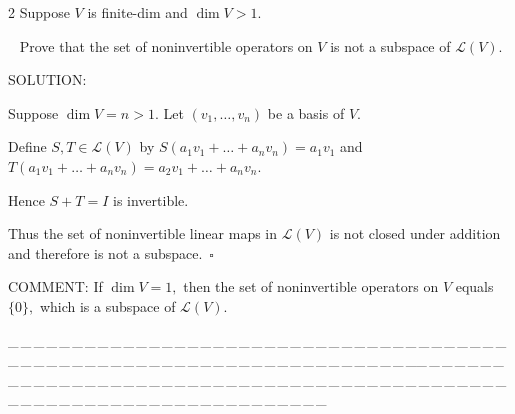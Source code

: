 \documentclass[a4paper, 11pt, UTF8]{article}
\def\Lm{\mathcal{L}}
\begin{document}
\begin{large}
{\timesbf\Large 2} {\timessl\Large 
Suppose $V$ is finite-dim and $\dim V > 1$.}\par\,\,\,
{\timessl\Large Prove that the set of noninvertible operators on $V$ is not a subspace of $\Lm(V)$.
}\par
{\timesbf S\footnotesize{OLUTION:}}\par\quad
Suppose $\dim V=n>1.$ Let $(v_1,\dots,v_n)$ be a basis of $V$.\par\quad
Define $S,T\in\Lm(V)$ by $S(a_1 v_1+\dots+a_n v_n)=a_1 v_1$ and $T(a_1 v_1+\dots+a_n v_n)=a_2 v_1+\dots+a_n v_n$.\par\quad
Hence $S+T=I$ is invertible.\par\quad
Thus the set of noninvertible linear maps in $\Lm(V)$ is not closed under addition and therefore is not a subspace.$\,\,\,\square$\par\quad
C{\small OMMENT:} If $\dim V=1,$ then the set of noninvertible operators on $V$ equals $\{0\},$ which is a subspace of $\Lm(V).$\par
\par
{\tiny \_\,\_\,\_\,\_\,\_\,\_\,\_\,\_\,\_\,\_\,\_\,\_\,\_\,\_\,\_\,\_\,\_\,\_\,\_\,\_\,\_\,\_\,\_\,\_\,\_\,\_\,\_\,\_\,\_\,\_\,\_\,\_\,\_\,\_\,\_\,\_\,\_\,\_\,\_\,\_\,\_\,\_\,\_\,\_\,\_\,\_\,\_\,\_\,\_\,\_\,\_\,\_\,\_\,\_\,\_\,\_\,\_\,\_\,\_\,\_\,\_\,\_\,\_\,\_\,\_\,\_\,\_\,\_\,\_\,\_\,\_\_\,\_\,\_\,\_\,\_\,\_\,\_\,\_\,\_\,\_\,\_\,\_\,\_\,\_\,\_\,\_\,\_\,\_\,\_\,\_\,\_\,\_\,\_\,\_\,\_\,\_\,\_\,\_\,\_\,\_\,\_\,\_\,\_\,\_\,\_\,\_\,\_\,\_\,\_\,\_\,\_\,\_\,\_\,\_\,\_\,\_\,\_\,\_\,\_\,\_\,\_\,\_\,\_\,\_\,\_\,\_\,\_\,\_\,\_\,\_\,\_\,\_\,\_\,\_\,\_\,\_\,\_\,\_\,\_\,\_\,\_}\par


\end{large}
\end{document}
